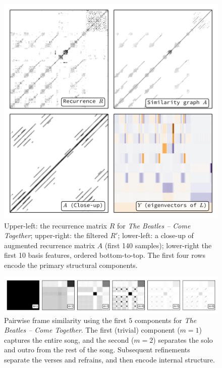 \documentclass{article}
\begin{document}
\begin{figure}
\centering
\includegraphics[width=\columnwidth]{figs/recurrence}
\caption{Upper-left: the recurrence matrix $R$ for \emph{The Beatles -- Come
Together}; upper-right: the filtered $R'$; lower-left: a close-up of augmented
recurrence matrix $A$ (first 140 samples); 
lower-right the first 10 basis features, ordered bottom-to-top.  
The first four rows encode the primary structural components.\label{recurrence}}
\end{figure}

 
\begin{figure}
\centering
\includegraphics[width=\textwidth]{figs/lowrank}
\caption{Pairwise frame similarity using the first $5$ components for \emph{The Beatles -- Come Together}.  The first
(trivial) component ($m=1$) captures the entire song, and the second ($m=2$) separates the solo and outro from the
rest of the song.  Subsequent refinements separate the verses and refrains, and then encode internal structure.\label{lowrank}}
\end{figure}
\end{document}

